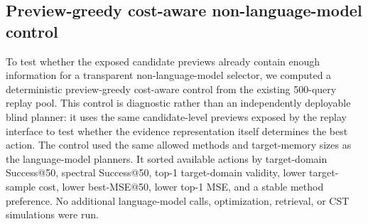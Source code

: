 \documentclass[final,1p,times]{elsarticle}
\begin{document}
\subsection{Preview-greedy cost-aware non-language-model control}

To test whether the exposed candidate previews already contain enough information for a transparent non-language-model selector, we computed a deterministic preview-greedy cost-aware control from the existing 500-query replay pool. This control is diagnostic rather than an independently deployable blind planner: it uses the same candidate-level previews exposed by the replay interface to test whether the evidence representation itself determines the best action. The control used the same allowed methods and target-memory sizes as the language-model planners. It sorted available actions by target-domain Success@50, spectral Success@50, top-1 target-domain validity, lower target-sample cost, lower best-MSE@50, lower top-1 MSE, and a stable method preference. No additional language-model calls, optimization, retrieval, or CST simulations were run.
\end{document}
